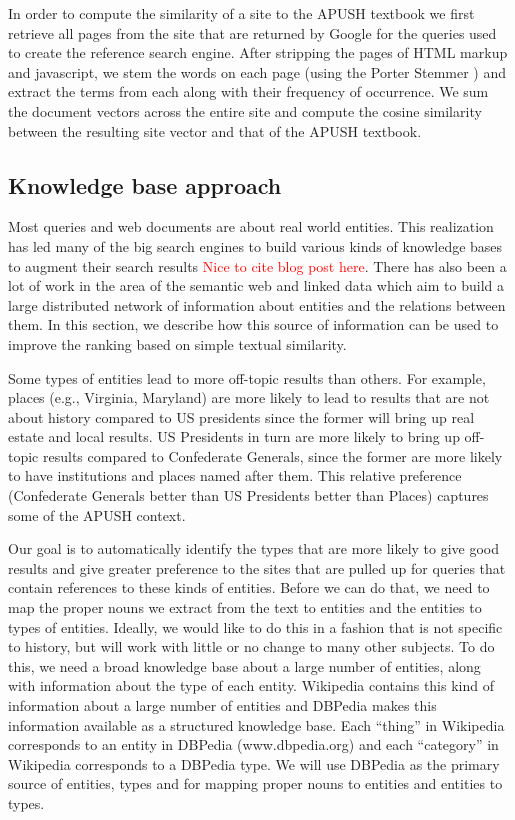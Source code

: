 \documentclass[pdfpagelabels=false,plainpages=true]{acm_proc_article-sp}
\begin{document}
In order to compute the similarity of a site to the APUSH textbook we first
retrieve all pages from the site that are returned by Google for the queries
used to create the reference search engine. After stripping the pages of HTML
markup and javascript, we stem the words on each page (using the Porter Stemmer 
\cite{porter1980algorithm}) and extract the terms from each along with their
frequency of occurrence. We sum the document vectors across the entire site and
compute the cosine similarity between the resulting site vector and that of
the APUSH textbook.

\subsection{Knowledge base approach}

Most queries and web documents are about real world entities.  This realization
has led many of the big search engines to build various kinds of knowledge
bases to augment their search results \textcolor{red}{Nice to cite blog post
  here}. There has also been a lot of work in the area of the semantic web
and linked data \cite{berners2001semantic,bizer2008linked} which aim to build a
large distributed network of information about entities and the relations
between them. In this section, we describe how this source of information can be
used to improve the ranking based on simple textual similarity.  

Some types of entities lead to more off-topic results than others. For example,
places (e.g., Virginia, Maryland) are more likely to lead to results that are
not about history compared to US presidents since the former will bring up real
estate and local results. US Presidents in turn are more likely to bring up
off-topic results compared to Confederate Generals, since the former are more
likely to have institutions and places named after them. This relative preference
(Confederate Generals better than US Presidents better than Places) captures
some of the APUSH context. 

Our goal is to automatically identify the types that are more likely to give
good results and give greater preference to the sites that are pulled up for
queries that contain references to these kinds of entities. Before we can do
that, we need to map the proper nouns we extract from the text to entities and
the entities to types of entities. Ideally, we would like to do this in a
fashion that is not specific to history, but will work with little or no change
to many other subjects. To do this, we need a broad knowledge base about a large
number of entities, along with information about the type of each
entity. Wikipedia contains this kind of information about a large number of
entities and DBPedia makes this information available as a structured knowledge
base. Each ``thing'' in Wikipedia corresponds to an entity in DBPedia
(www.dbpedia.org) and each ``category'' in Wikipedia corresponds to a DBPedia
type. We will use DBPedia as the primary source of entities, types and for
mapping proper nouns to entities and entities to types. 
\end{document}
